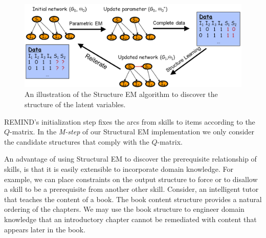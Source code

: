 \documentclass{edm_template}
\begin{document}
\begin{figure}
	\begin{center}
		\includegraphics[width=1.0\linewidth]{figures/sem.png}
	\end{center}
	\caption{\small An illustration of the Structure EM algorithm to discover the structure of the latent variables.}
	\label{fig:sem} 
\end{figure} 

REMIND's  initialization step
fixes the arcs from skills to items according to the ${Q}$-matrix.
In  the \emph{M-step} of our Structural EM implementation we only consider the candidate structures that comply with the ${Q}$-matrix.

An advantage of using Structural EM to discover the prerequisite relationship of skills, is that it is easily extensible to incorporate domain knowledge.
For example, we can  place constraints on the output structure to force or to disallow a skill to be a prerequisite from another other skill.
Consider,  an intelligent tutor that teaches the content of a book. 
The book content structure provides a natural ordering of the chapters. %
We may use the book structure to engineer domain knowledge that  an  introductory chapter cannot be remediated  with  content that appears later in the book.
\end{document}
